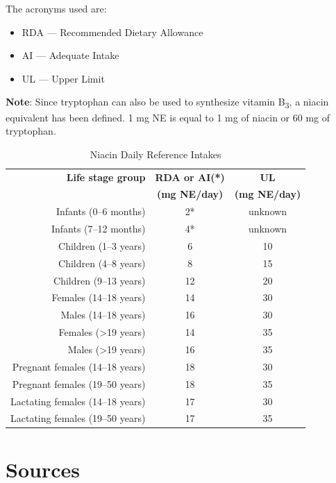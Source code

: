 \documentclass{book}
\begin{document}
The acronyms used are:
\begin{itemize}
	\item RDA --- Recommended Dietary Allowance
	\item AI --- Adequate Intake
	\item UL --- Upper Limit
\end{itemize}

\textbf{Note}: Since tryptophan can also be used to synthesize vitamin B\textsubscript{3}, a niacin equivalent has been defined. 1 mg NE is equal to 1 mg of niacin or 60 mg of tryptophan.

\begin{table}[h]
	\caption{Niacin Daily Reference Intakes}
	\centering \begin{tabular}{| r | c | c |}
		\hline
		\textbf{Life stage group} & \textbf{RDA or AI(*)} & \textbf{UL}\\
		& \textbf{(mg NE/day)} & \textbf{(mg NE/day)}\\ \hline
		Infants (0--6 months) & 2* & unknown\\ \hline
		Infants (7--12 months) & 4* & unknown\\ \hline
		Children (1--3 years) & 6 & 10\\ \hline
		Children (4--8 years) & 8 & 15\\ \hline
		Children (9--13 years) & 12 & 20\\ \hline
		Females (14--18 years) & 14 & 30\\ \hline
		Males (14--18 years) & 16 & 30\\ \hline
		Females (\textgreater19 years) & 14 & 35\\ \hline
		Males (\textgreater19 years) & 16 & 35\\ \hline
		Pregnant females (14--18 years) & 18 & 30\\ \hline
		Pregnant females (19--50 years) & 18 & 35\\ \hline
		Lactating females (14--18 years) & 17 & 30\\ \hline
		Lactating females (19--50 years) & 17 & 35\\ \hline
	\end{tabular}
\end{table}
\newpage

\section{Sources}
\end{document}
